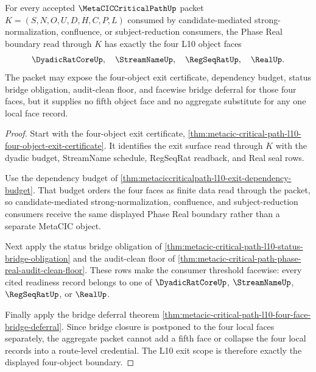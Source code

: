 \begin{theorem}
\label{thm:metacic-critical-path-l10-exit-scope-seal}
For every accepted $\MetaCICCriticalPathUp$ packet $K=(S,N,O,U,D,H,C,P,L)$
consumed by candidate-mediated strong-normalization, confluence, or
subject-reduction consumers, the Phase Real boundary read through $K$ has
exactly the four L10 object faces
$$
\DyadicRatCoreUp,\quad \StreamNameUp,\quad \RegSeqRatUp,\quad \RealUp .
$$
The packet may expose the four-object exit certificate, dependency budget,
status bridge obligation, audit-clean floor, and facewise bridge deferral for
those four faces, but it supplies no fifth object face and no aggregate
substitute for any one local face record.
\end{theorem}
\begin{proof}
Start with the four-object exit certificate,
\autoref{thm:metacic-critical-path-l10-four-object-exit-certificate}. It
identifies the exit surface read through $K$ with the dyadic budget,
StreamName schedule, RegSeqRat readback, and Real seal rows.

Use the dependency budget of
\autoref{thm:metaciccriticalpath-l10-exit-dependency-budget}. That budget orders
the four faces as finite data read through the packet, so candidate-mediated
strong-normalization, confluence, and subject-reduction consumers receive the
same displayed Phase Real boundary rather than a separate MetaCIC object.

Next apply the status bridge obligation of
\autoref{thm:metacic-critical-path-l10-status-bridge-obligation} and the
audit-clean floor of
\autoref{thm:metacic-critical-path-phase-real-audit-clean-floor}. These rows
make the consumer threshold facewise: every cited readiness record belongs to
one of $\DyadicRatCoreUp$, $\StreamNameUp$, $\RegSeqRatUp$, or $\RealUp$.

Finally apply the bridge deferral theorem
\autoref{thm:metacic-critical-path-l10-four-face-bridge-deferral}. Since bridge
closure is postponed to the four local faces separately, the aggregate packet
cannot add a fifth face or collapse the four local records into a route-level
credential. The L10 exit scope is therefore exactly the displayed four-object
boundary.
\end{proof}
